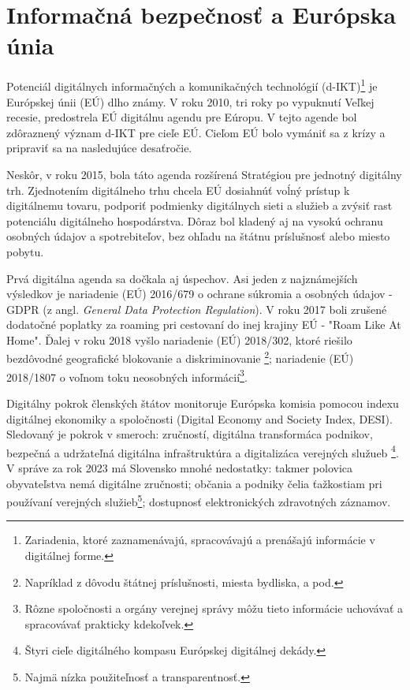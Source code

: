 \chapter{Informačná bezpečnosť a Európska únia}
Potenciál digitálnych informačných a komunikačných technológií (d-IKT)\footnote{Zariadenia, ktoré zaznamenávajú, spracovávajú
a prenášajú informácie v digitálnej forme.} je Európskej únii (EÚ) dlho známy. V roku 2010, tri roky po vypuknutí Veľkej
recesie, predostrela EÚ digitálnu agendu pre Eúropu\cite{DAEU}. V tejto agende bol zdôraznený význam d-IKT pre cieľe EÚ.
Cieľom EÚ bolo vymániť sa z krízy a pripraviť sa na nasledujúce desaťročie. 

Neskôr, v roku 2015, bola táto agenda rozšírená Stratégiou pre jednotný digitálny trh\cite{DMA}. Zjednotením digitálneho 
trhu chcela EÚ dosiahnúť voĺný prístup k digitálnemu tovaru, podporiť podmienky digitálnych sieti a služieb a zvýsiť rast 
potenciálu digitálneho hospodárstva. Dôraz bol kladený aj na vysokú ochranu osobných údajov a spotrebiteľov, bez ohľadu
na štátnu príslušnosť alebo miesto pobytu.

Prvá digitálna agenda sa dočkala aj úspechov. Asi jeden z najznámejších výsledkov je nariadenie (EÚ) 2016/679 o ochrane
súkromia a osobných údajov - GDPR (z angl. \textit{General Data Protection Regulation}). V roku 2017 boli zrušené dodatočné 
poplatky za roaming pri cestovaní do inej krajiny EÚ - "Roam Like At Home"\cite{RoamingEU}.
Ďalej v roku 2018 vyšlo nariadenie (EÚ) 2018/302, ktoré riešilo bezdôvodné geografické blokovanie a diskriminovanie
\footnote{Napríklad z dôvodu štátnej príslušnosti, miesta bydliska, a pod.}; nariadenie (EÚ) 2018/1807 o voľnom toku neosobných
informácií\footnote{Rôzne spoločnosti a orgány verejnej správy môžu tieto informácie uchovávať a spracovávať prakticky
kdekoľvek.}.

Digitálny pokrok členských štátov monitoruje Európska komisia pomocou indexu digitálnej ekonomiky a spoločnosti (Digital
Economy and Society Index, DESI). Sledovaný je pokrok v smeroch: zručností, digitálna transformáca podnikov, bezpečná a
udržateľná digitálna infraštruktúra a digitalizáca verejných služueb \footnote{Štyri cieľe digitálného kompasu Európskej
digitálnej dekády.}. V správe za rok 2023 \cite{Report2023}
má Slovensko mnohé nedostatky: takmer polovica obyvateľstva nemá digitálne zručnosti; občania a podniky čelia ťažkostiam 
pri používaní verejných služieb\footnote{Najmä nízka použiteľnosť a transparentnosť.}; dostupnosť elektronických zdravotných
záznamov.



